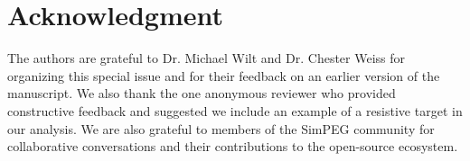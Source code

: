 \documentclass[
    paper
]{geophysics}
\begin{document}
\section*{Acknowledgment}

The authors are grateful to Dr. Michael Wilt and Dr. Chester Weiss for organizing this special issue and for their feedback on an earlier version of the manuscript. We also thank the one anonymous reviewer who provided constructive feedback and suggested we include an example of a resistive target in our analysis. We are also grateful to members of the SimPEG community for collaborative conversations and their contributions to the open-source ecosystem.

\clearpage


\end{document}

